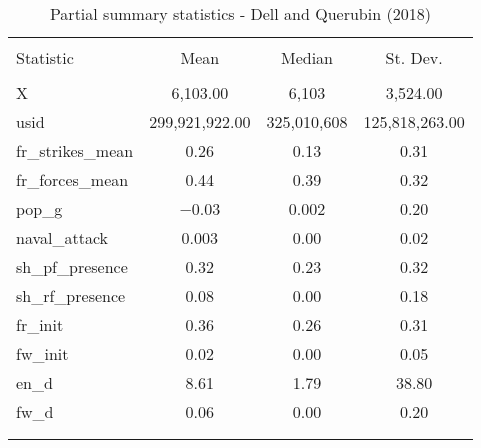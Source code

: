 
\begin{table}[!htbp] \centering 
  \caption{Partial summary statistics - Dell and Querubin (2018)} 
  \label{} 
\begin{tabular}{@{\extracolsep{5pt}}lccc} 
\\[-1.8ex]\hline 
\hline \\[-1.8ex] 
Statistic & \multicolumn{1}{c}{Mean} & \multicolumn{1}{c}{Median} & \multicolumn{1}{c}{St. Dev.} \\ 
\hline \\[-1.8ex] 
X & 6,103.00 & 6,103 & 3,524.00 \\ 
usid & 299,921,922.00 & 325,010,608 & 125,818,263.00 \\ 
fr\_strikes\_mean & 0.26 & 0.13 & 0.31 \\ 
fr\_forces\_mean & 0.44 & 0.39 & 0.32 \\ 
pop\_g & $-$0.03 & 0.002 & 0.20 \\ 
naval\_attack & 0.003 & 0.00 & 0.02 \\ 
sh\_pf\_presence & 0.32 & 0.23 & 0.32 \\ 
sh\_rf\_presence & 0.08 & 0.00 & 0.18 \\ 
fr\_init & 0.36 & 0.26 & 0.31 \\ 
fw\_init & 0.02 & 0.00 & 0.05 \\ 
en\_d & 8.61 & 1.79 & 38.80 \\ 
fw\_d & 0.06 & 0.00 & 0.20 \\ 
\hline \\[-1.8ex] 
\multicolumn{4}{l}{} \\ 
\end{tabular} 
\end{table} 
